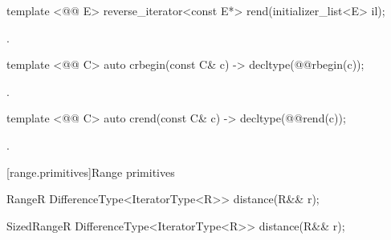 %
\begin{itemdecl}
template <@@ E> reverse_iterator<const E*> rend(initializer_list<E> il);
\end{itemdecl}
\begin{itemdescr}
\pnum \returns {}.
\end{itemdescr}

%
\begin{itemdecl}
template <@@ C> auto crbegin(const C& c) -> decltype(@@rbegin(c));
\end{itemdecl}
\begin{itemdescr}
\pnum \returns {}.
\end{itemdescr}

%
\begin{itemdecl}
template <@@ C> auto crend(const C& c) -> decltype(@@rend(c));
\end{itemdecl}
\begin{itemdescr}
\pnum \returns {}.
\end{itemdescr}

{\color{newclr}
[range.primitives]{Range primitives}

%
\begin{itemdecl}
Range{R}
DifferenceType<IteratorType<R>> distance(R&& r);
\end{itemdecl}

\begin{itemdescr}
\pnum \returns {}
\end{itemdescr}

%
\begin{itemdecl}
SizedRange{R}
DifferenceType<IteratorType<R>> distance(R&& r);
\end{itemdecl}

\begin{itemdescr}
\pnum \returns {}
\end{itemdescr}
}
